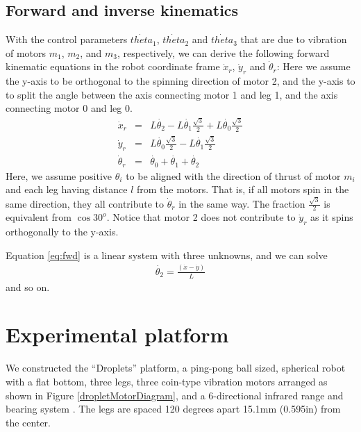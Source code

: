 \documentclass[letterpaper, 10pt, conference]{ieeeconf}
\begin{document}
\subsection{Forward and inverse kinematics}
With the control parameters $\dot{theta}_1$, $\dot{theta}_2$ and $\dot{theta}_3$ that are due to vibration of motors $m_1$, $m_2$, and $m_3$, respectively, we can derive the following forward kinematic equations in the robot coordinate frame $\dot{x}_r$, $\dot{y}_r$ and $\dot{\theta}_r$:
Here we assume the y-axis to be orthogonal to the spinning direction of motor 2, and the y-axis to to split the angle between the axis connecting motor 1 and leg 1, and the axis connecting motor 0 and leg 0.
\begin{eqnarray}\label{eq:fwd}
\dot{x}_r &=& L\dot{\theta_2}-L\dot{\theta_1}\frac{\sqrt{3}}{2}+L\dot{\theta_0}\frac{\sqrt{3}}{2}\\
\dot{y}_r &=& L\dot{\theta_0}\frac{\sqrt{3}}{2} - L\dot{\theta_1}\frac{\sqrt{3}}{2}\\
\dot{\theta}_r &=& \dot{\theta_0} + \dot{\theta_1} + \dot{\theta_2}
\end{eqnarray}
Here, we assume positive $\theta_i$ to be aligned with the direction of thrust of motor $m_i$ and each leg having distance $l$ from the motors. That is, if all motors spin in the same direction, they all contribute to $\dot{\theta}_r$ in the same way. The fraction $\frac{\sqrt{3}}{2}$ is equivalent from $\cos 30^o$. Notice that motor 2 does not contribute to $\dot{y}_r$ as it spins orthogonally to the y-axis.

Equation \ref{eq:fwd} is a linear system with three unknowns, and we can solve
\begin{eqnarray}
\dot{\theta_2}=\frac{(\dot{x}-\dot{y})}{L}
\end{eqnarray}
and so on.



\section{Experimental platform}
We constructed the ``Droplets'' platform, a ping-pong ball sized, spherical robot with a flat bottom, three legs, three coin-type vibration motors arranged as shown in Figure \ref{dropletMotorDiagram}, and a 6-directional infrared range and bearing system \cite{farrow14}. The legs are spaced 120 degrees apart 15.1mm (0.595in) from the center.
\end{document}
